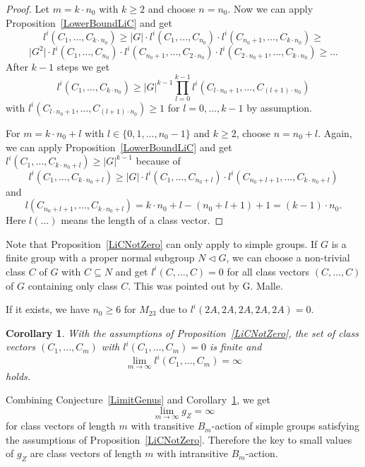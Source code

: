 \documentclass[12pt,a4paper]{article}
\newtheorem{corollary}{Corollary}[section]
\numberwithin{equation}{section}
\numberwithin{table}{section}
\begin{document}
\begin{proof}
Let $m=k \cdot n_0$ with $k \geq 2$ and choose $n=n_0$. Now we can apply Proposition~\ref{LowerBoundLiC} and get
$$l^i(C_1,\dots, C_{k \cdot n_0}) \geq
\vert G \vert \cdot l^i(C_1,\dots, C_{n_0}) \cdot l^i(C_{n_0 + 1},\dots, C_{k \cdot n_0}) \geq$$
$$\vert G^2 \vert \cdot l^i(C_1,\dots, C_{n_0}) \cdot l^i(C_{n_0 + 1},\dots, C_{2 \cdot n_0}) 
\cdot l^i(C_{2 \cdot n_0 + 1},\dots, C_{k \cdot n_0}) \geq ...$$
After $k-1$ steps we get
$$l^i(C_1,\dots, C_{k \cdot n_0}) \geq
{\vert G \vert}^{k-1} \prod_{l=0}^{k-1} {l^i(C_{l \cdot n_0 + 1},\dots, C_{(l+1) \cdot n_0})}$$
with
$l^i(C_{l \cdot n_0 + 1},\dots, C_{(l+1) \cdot n_0}) \geq 1$ for $l=0, \dots, k-1$ by assumption.
\par
\noindent
For $m=k \cdot n_0 + l$ with $l \in \{0,1,\dots, n_0-1 \}$ and $k \geq 2$, choose $n=n_0 + l$. Again, we can
apply Proposition~\ref{LowerBoundLiC} and get $l^i(C_1,\dots, C_{k \cdot n_0 + l}) \geq {\vert G \vert}^{k-1}$
because of
$$l^i(C_1,\dots, C_{k \cdot n_0 + l}) \geq
\vert G \vert \cdot l^i(C_1,\dots, C_{n_0 + l}) \cdot l^i(C_{n_0 + l + 1},\dots, C_{k \cdot n_0 + l})$$
and 
$$l(C_{n_0 + l + 1},\dots, C_{k \cdot n_0 + l}) = k \cdot n_0 + l - (n_0 + l + 1) + 1 = (k-1) \cdot n_0.$$
Here $l(...)$ means the length of a class vector.
\end{proof}
%
\noindent
Note that Proposition~\ref{LiCNotZero} can only apply to simple groups.
If $G$ is a finite group with a proper normal subgroup $N \vartriangleleft G$, we can choose
a non-trivial class $C$ of $G$ with $C \subseteq N$ and get
$l^i(C, \dots, C) = 0$ for all class vectors $(C, \dots, C)$ of $G$ containing only class $C$.
This was pointed out by G. Malle.
\par
\noindent
If it exists, we have $n_0 \geq 6$ for $M_{23}$ due to $l^i(2A,2A,2A,2A,2A)=0$.
%
\begin{corollary}
\label{LiCInfinite} 
With the assumptions of Proposition~\ref{LiCNotZero}, the set of class vectors
$(C_1,\dots, C_m)$ with $l^i(C_1,\dots, C_m)=0$ is finite
and
$$\lim\limits_{m \to\infty} l^i(C_1,\dots, C_m) = \infty$$
holds.
\end{corollary}
%
\noindent
Combining Conjecture~\ref{LimitGenus} and Corollary~\ref{LiCInfinite}, we get 
$$\lim\limits_{m \to\infty} g_Z = \infty$$
for class vectors of length $m$ with transitive $B_m$-action of simple groups satisfying
the assumptions of Proposition~\ref{LiCNotZero}. Therefore the key to small values of $g_Z$
are class vectors of length $m$ with intransitive $B_m$-action.
\par
\end{document}
